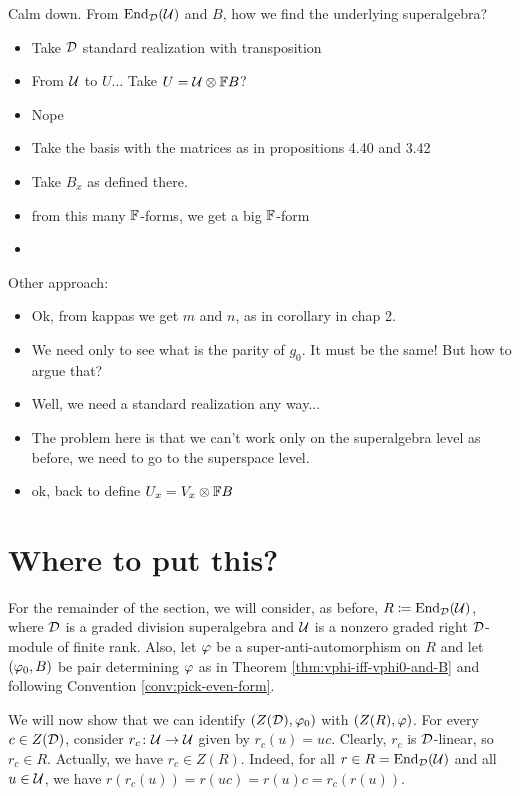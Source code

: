 Calm down. 
From $\operatorname{End}_{\mathcal{D}}(\mathcal U)$ and $B$, how we find the underlying superalgebra?

\begin{itemize}
    \item Take $\mathcal{D}$ standard realization with transposition
    \item From $\mathcal U$ to $U$... Take $U = \mathcal U \otimes \mathbb{F} B$?
    \item Nope
    \item Take the basis with the matrices as in propositions 4.40 and 3.42
    \item Take $B_x$ as defined there.
    \item from this many $\mathbb{F}$-forms, we get a big $\mathbb{F}$-form
    \item 
\end{itemize}

Other approach:

\begin{itemize}
    \item Ok, from kappas we get $m$ and $n$, as in corollary in chap 2.
    \item We need only to see what is the parity of $g_0$. 
    It must be the same! 
    But how to argue that?
    \item Well, we need a standard realization any way...
    \item The problem here is that we can't work only on the superalgebra level as before, we need to go to the superspace level.
    \item ok, back to define $U_x = V_x \otimes \mathbb{F} B$
\end{itemize}

\section{Where to put this?}

For the remainder of the section, we will consider, as before, $R \coloneqq \operatorname{End}_{\mathcal{D}}(\mathcal U)$, where $\mathcal{D}$ is a graded division superalgebra and $\mathcal U$ is a nonzero graded right $\mathcal{D}$-module of finite rank.
Also, let $\varphi$ be a super-anti-automorphism on $R$ and let $(\varphi_0, B)$ be pair determining $\varphi$ as in Theorem \ref{thm:vphi-iff-vphi0-and-B} and following Convention \ref{conv:pick-even-form}.

We will now show that we can identify $(Z(\mathcal{D}), \varphi_0)$ with $(Z(R), \varphi)$.
For every $c\in Z(\mathcal{D})$, consider $r_c\colon \mathcal U \to \mathcal U$ given by $r_c(u) = uc$.
Clearly, $r_c$ is $\mathcal{D}$-linear, so $r_c \in R$.
Actually, we have $r_c\in Z(R)$.
Indeed, for all $r\in R = \operatorname{End}_{\mathcal{D}}(\mathcal U)$ and all $u\in \mathcal U$, we have $r (r_c(u)) = r(uc) = r(u) c = r_c(r(u))$.

